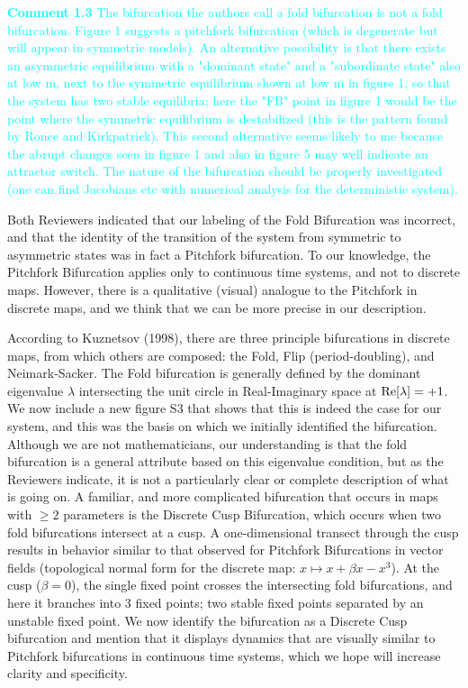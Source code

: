 \documentclass[ucm,12pt]{ucletter}
\begin{document}
\begin{letter}
\noindent \textcolor{cyan}{
{\bf Comment 1.3} The bifurcation the authors call a fold bifurcation is not a fold bifurcation. Figure 1 suggests a pitchfork bifurcation (which is degenerate but will appear in symmetric models). An alternative possibility is that there exists an asymmetric equilibrium with a "dominant state" and a "subordinate state" also at low m, next to the symmetric equilibrium shown at low m in figure 1, so that the system has two stable equilibria; here the "FB" point in figure 1 would be the point where the symmetric equilibrium is destabilized (this is the pattern found by Ronce and Kirkpatrick). This second alternative seems likely to me because the abrupt changes seen in figure 1 and also in figure 5 may well indicate an attractor switch. The nature of the bifurcation should be properly investigated (one can find Jacobians etc with numerical analysis for the deterministic system).
}

 Both Reviewers indicated that our labeling of the Fold Bifurcation was incorrect, and that the identity of the transition of the system from symmetric to asymmetric states was in fact a Pitchfork bifurcation. To our knowledge, the Pitchfork Bifurcation applies only to continuous time systems, and not to discrete maps. However, there is a qualitative (visual) analogue to the Pitchfork in discrete maps, and we think that we can be more precise in our description.

According to Kuznetsov (1998), there are three principle bifurcations in discrete maps, from which others are composed: the Fold, Flip (period-doubling), and Neimark-Sacker.
The Fold bifurcation is generally defined by the dominant eigenvalue $\lambda$ intersecting the unit circle in Real-Imaginary space at ${\rm Re}[\lambda]=+1$.
We now include a new figure S3 that shows that this is indeed the case for our system, and this was the basis on which we initially identified the bifurcation. Although we are not mathematicians, our understanding is that the fold bifurcation is a general attribute based on this eigenvalue condition, but as the Reviewers indicate, it is not a particularly clear or complete description of what is going on. 
A familiar, and more complicated bifurcation that occurs in maps with $\geq2$ parameters is the Discrete Cusp Bifurcation, which occurs when two fold bifurcations intersect at a cusp.
A one-dimensional transect through the cusp results in behavior similar to that observed for Pitchfork Bifurcations in vector fields (topological normal form for the discrete map: $x \mapsto x + \beta x - x^3$). At the cusp ($\beta=0$), the single fixed point crosses the intersecting fold bifurcations, and here it branches into 3 fixed points; two stable fixed points separated by an unstable fixed point.
We now identify the bifurcation as a Discrete Cusp bifurcation and mention that it displays dynamics that are visually similar to Pitchfork bifurcations in continuous time systems, which we hope will increase clarity and specificity.


\end{letter}
\end{document}
